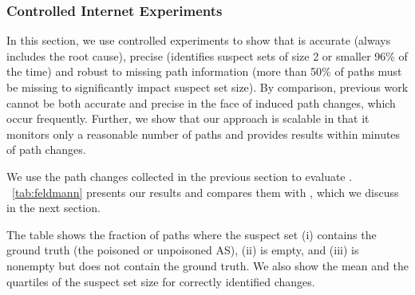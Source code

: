 \subsubsection{Controlled Internet Experiments}  
\label{sec:poisonings}

In this section, we use controlled experiments to show that \ouralgo is
accurate (always includes the root cause), precise (identifies suspect
sets of size 2 or smaller 96\% of the time) and robust to missing path
information (more than 50\% of paths must be missing to significantly
impact suspect set size). By comparison, previous work cannot be both
accurate and precise in the face of induced path changes, which occur
frequently. Further, we show that our approach is scalable in that it
monitors only a reasonable number
of paths and provides results within minutes of path changes. 



We use the path changes collected in the previous section to evaluate 
\ouralgo. \tab~\ref{tab:feldmann} presents our results and compares them 
with \feldmann, which we discuss in the next section. 

The table shows the fraction of paths where the suspect set (i) contains the
ground truth (\ie the poisoned or unpoisoned AS), (ii) is empty, and
(iii) is nonempty but does not contain the ground truth.  We also show
the mean and the quartiles of the suspect set size for correctly
identified changes.  

 %


